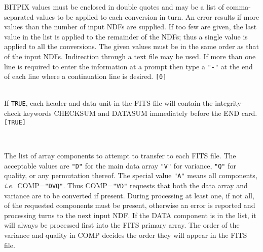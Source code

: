 \documentclass[twoside,11pt]{article}
\newcommand{\dqt}[1]{{\texttt{"#1"}}}
\newcommand{\sstsubsection}[1]{ \item[{#1}] \mbox{} \\}
\newcommand{\sstsubsection}[1]{\item[{#1}]}
\begin{document}
{{{         BITPIX values must be enclosed in double quotes and may be a list 
         of comma-separated values to be applied to each conversion in turn.
         An error results if more values than the number of input NDFs are
         supplied.  If too few are given, the last value in the list is
         applied to the remainder of the NDFs; thus a single value is 
         applied to all the conversions.  
         The given values must be in the same order as that of the input NDFs.
         Indirection through a text file may be used.
         If more than one line is required to enter the information at a prompt
         then type a \texttt{"-"} at the end of each line where a
         continuation line is desired.
         \texttt{[0]}
      }
      \sstsubsection{
         CHECKSUM = \_LOGICAL (Read)
      }{
         If \texttt{TRUE}, each header and data unit in the FITS file will
         contain the integrity-check keywords CHECKSUM and DATASUM 
         immediately before the END card.  \texttt{[TRUE]}
      }
      \sstsubsection{
         COMP = LITERAL (Read)
      }{
         The list of array components to attempt to transfer to each
         FITS file.  The acceptable values are \texttt{"D"} for the main data
         array \texttt{"V"} for variance, \texttt{"Q"} for quality, or any
         permutation thereof.
         The special value \texttt{"A"} means all components,
         {\it i.e.}\ COMP=\dqt{DVQ}. Thus COMP=\dqt{VD} requests that 
         both the data array and variance are to be converted if present.  
         During processing at least one, if not all, of the requested
         components must be present, otherwise an error is reported and
         processing turns to the next input NDF.  If the DATA component
         is in the list, it will always be processed first into the
         FITS primary array.  The order of the variance and quality
         in COMP decides the order they will appear in the FITS file.

}}}
\end{document}
